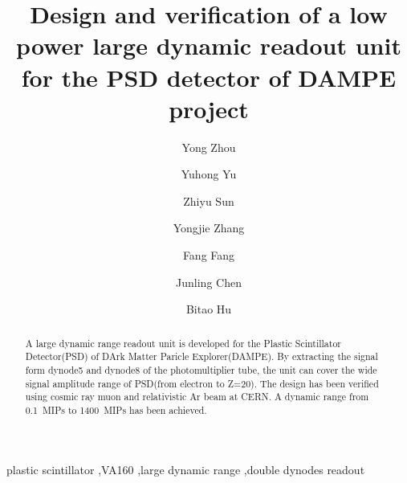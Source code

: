 \documentclass[5p, times]{elsarticle}
\begin{document}
\begin{frontmatter}

\title{Design and verification of a low power large dynamic readout unit for the PSD detector of DAMPE project}

\author[imp,lzu,ucas]{Yong Zhou}

\author[imp]{Yuhong Yu}

\author[imp]{Zhiyu Sun}
\author[imp]{Yongjie Zhang}
\author[imp]{Fang Fang}
\author[imp]{Junling Chen}

\author[lzu]{Bitao Hu}

\address[imp]{Institute of Modern Physics, Chinese Academy of Sciences,  509 Nanchang Road,  Lanzhou,  730000,  P.R.China}
\address[ucas]{Graduate University of the Chinese Academy of Sciences,  19A Yuquan Road,  Beijing,  100049,  P.R.China}
\address[lzu]{School of Nuclear Science and Technology,  Lanzhou University,  222 South Tianshui Road,  Lanzhou,  730000,  P.R.China}
\begin{abstract}

A large dynamic range readout unit is developed for the Plastic Scintillator Detector(PSD) of DArk Matter Paricle Explorer(DAMPE).
By extracting the signal form dynode5 and dynode8 of the photomultiplier tube, the unit can cover the wide signal amplitude range of PSD(from electron to Z=20).
The design has been verified using cosmic ray muon and relativistic Ar beam at CERN.
A dynamic range from \SI{0.1}{MIPs} to \SI{1400}{MIPs} has been achieved.

\end{abstract}

\begin{keyword}
plastic scintillator
\sep VA160
\sep large dynamic range
\sep double dynodes readout


\end{keyword}

\end{frontmatter}
\end{document}
